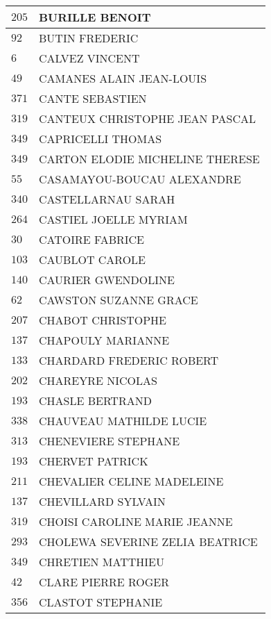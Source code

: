 \begin{xltabular}{\linewidth}{|l|X|}
    \hline
    $205$ & BURILLE BENOIT \\
    \hline
    $92$ & BUTIN FREDERIC \\
    \hline
    $6$ & CALVEZ VINCENT \\
    \hline
    $49$ & CAMANES ALAIN JEAN-LOUIS \\
    \hline
    $371$ & CANTE SEBASTIEN \\
    \hline
    $319$ & CANTEUX CHRISTOPHE JEAN PASCAL \\
    \hline
    $349$ & CAPRICELLI THOMAS \\
    \hline
    $349$ & CARTON ELODIE MICHELINE THERESE \\
    \hline
    $55$ & CASAMAYOU-BOUCAU ALEXANDRE \\
    \hline
    $340$ & CASTELLARNAU SARAH \\
    \hline
    $264$ & CASTIEL JOELLE MYRIAM \\
    \hline
    $30$ & CATOIRE FABRICE \\
    \hline
    $103$ & CAUBLOT CAROLE \\
    \hline
    $140$ & CAURIER GWENDOLINE \\
    \hline
    $62$ & CAWSTON SUZANNE GRACE \\
    \hline
    $207$ & CHABOT CHRISTOPHE \\
    \hline
    $137$ & CHAPOULY MARIANNE \\
    \hline
    $133$ & CHARDARD FREDERIC ROBERT \\
    \hline
    $202$ & CHAREYRE NICOLAS \\
    \hline
    $193$ & CHASLE BERTRAND \\
    \hline
    $338$ & CHAUVEAU MATHILDE LUCIE \\
    \hline
    $313$ & CHENEVIERE STEPHANE \\
    \hline
    $193$ & CHERVET PATRICK \\
    \hline
    $211$ & CHEVALIER CELINE MADELEINE \\
    \hline
    $137$ & CHEVILLARD SYLVAIN \\
    \hline
    $319$ & CHOISI CAROLINE MARIE JEANNE \\
    \hline
    $293$ & CHOLEWA SEVERINE ZELIA BEATRICE \\
    \hline
    $349$ & CHRETIEN MATTHIEU \\
    \hline
    $42$ & CLARE PIERRE ROGER \\
    \hline
    $356$ & CLASTOT STEPHANIE \\
    \hline

\end{xltabular}
